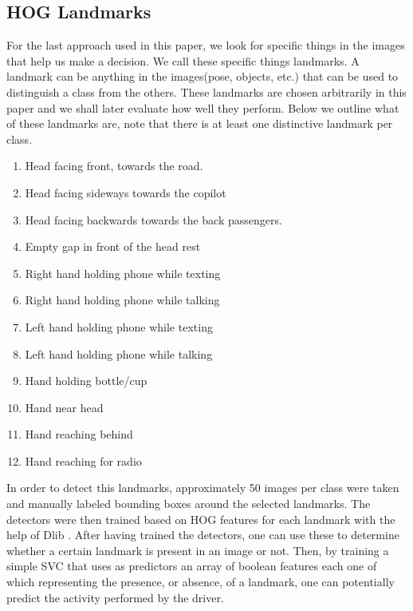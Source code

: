 \documentclass[10pt,twocolumn,letterpaper]{article}
\begin{document}
\subsection{HOG Landmarks}
For the last approach used in this paper, we look for specific things in the images that help us make a decision. We call these specific things landmarks. A landmark can be anything in the images(pose, objects, etc.) that can be used to distinguish a class from the others. These landmarks are chosen arbitrarily in this paper and we shall later evaluate how well they perform. Below we outline what of these landmarks are, note that there is at least one distinctive landmark per class.

\begin{enumerate}
	\item Head facing front, towards the road.
	\item Head facing sideways towards the copilot
	\item Head facing backwards towards the back passengers.
	\item Empty gap in front of the head rest
	\item Right hand holding phone while texting
	\item Right hand holding phone while talking\
	\item Left hand holding phone while texting
	\item Left hand holding phone while talking
	\item Hand holding bottle/cup
	\item Hand near head
	\item Hand reaching behind
	\item Hand reaching for radio	
\end{enumerate}

In order to detect this landmarks, approximately 50 images per class were taken and manually labeled bounding boxes around the selected landmarks. The detectors were then trained based on HOG features for each landmark with the help of Dlib \cite{dlib09}.
After having trained the detectors, one can use these to determine whether a certain landmark is present in an image or not. Then, by training a simple SVC that uses as predictors an array of boolean features each one of which representing the presence, or absence, of a landmark, one can potentially predict the activity performed by the driver.



 
\end{document}
